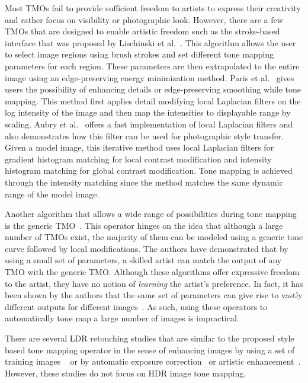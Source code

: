 Most TMOs fail to provide sufficient freedom to artists to express their creativity and rather focus on visibility or photographic look. However, there are a few TMOs that are designed to enable artistic freedom such as the stroke-based interface that was proposed by Lischinski et al.~\cite{Lischinski2006}. This algorithm allows the user to select image regions using brush strokes and set different tone mapping parameters for each region. These parameters are then extrapolated to the entire image using an edge-preserving energy minimization method. Paris et al.~\cite{paris2011local} gives users the possibility of enhancing details or edge-preserving smoothing while tone mapping. This method first applies detail modifying local Laplacian filters on the log intensity of the image and then map the intensities to displayable range by scaling. Aubry et al.~\cite{aubry2014fast} offers a fast implementation of local Laplacian filters and also demonstrates how this filter can be used for photographic style transfer. Given a model image, this iterative method uses local Laplacian filters for gradient histogram matching for local contrast modification and intensity histogram matching for global contrast modification. Tone mapping is achieved through the intensity matching since the method matches the same dynamic range of the model image.

Another algorithm that allows a wide range of possibilities during tone mapping is the generic TMO~\cite{Mantiuk08a}. This operator hinges on the idea that although a large number of TMOs exist, the majority of them can be modeled using a generic tone curve followed by local modifications. The authors have demonstrated that by using a small set of parameters, a skilled artist can match the output of any TMO with the generic TMO. Although these algorithms offer expressive freedom to the artist, they have no notion of \emph{learning} the artist's preference. In fact, it has been shown by the authors that the same set of parameters can give rise to vastly different outputs for different images~\cite{Mantiuk08a}. As such, using these operators to automatically tone map a large number of images is impractical. 

There are several LDR retouching studies that are similar to the proposed style based tone mapping operator in the sense of enhancing images by using a set of training images ~\cite{kang2010personalization, bychkovsky2011learning} or by automatic exposure correction~\cite{yuan2012automatic} or artistic enhancement~\cite{son2014art}. However, these studies do not focus on HDR image tone mapping.

